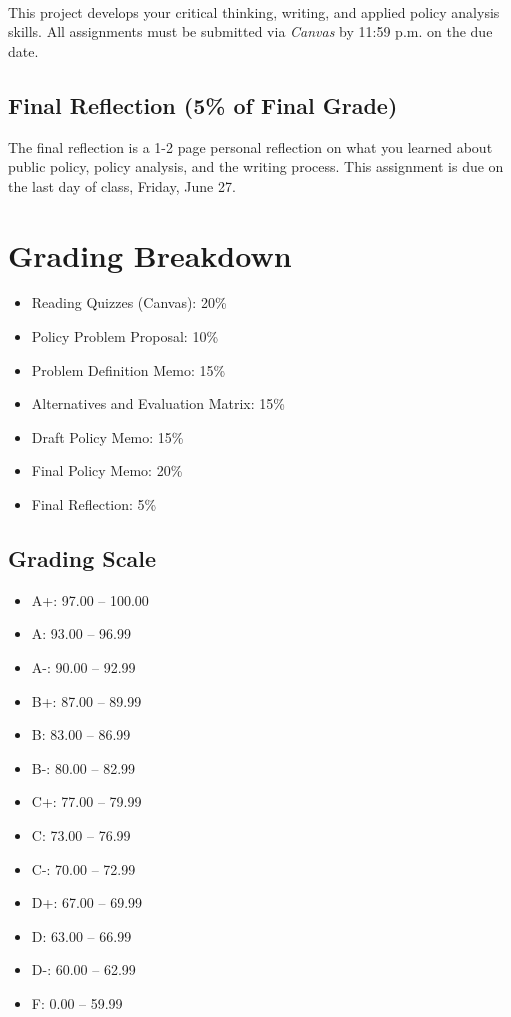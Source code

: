 \documentclass[11pt, letterpaper]{article}
\begin{document}
\paragraph{} This project develops your critical thinking, writing, and applied policy analysis skills. All assignments must be submitted via \emph{Canvas} by 11:59 p.m. on the due date.

\subsection*{Final Reflection (5\% of Final Grade)}

The final reflection is a 1-2 page personal reflection on what you learned about public policy, policy analysis, and the writing process. This assignment is due on the last day of class, Friday, June 27.


\section{Grading Breakdown}
\begin{itemize}
  \item Reading Quizzes (Canvas): 20\%
  \item Policy Problem Proposal: 10\%
  \item Problem Definition Memo: 15\%
  \item Alternatives and Evaluation Matrix: 15\%
  \item Draft Policy Memo: 15\%
  \item Final Policy Memo: 20\%
  \item Final Reflection: 5\%
\end{itemize}

\subsection*{Grading Scale}

\begin{itemize}
    \item A+: 97.00 -- 100.00
    \item A: 93.00 -- 96.99
    \item A-: 90.00 -- 92.99
    \item B+: 87.00 -- 89.99
    \item B: 83.00 -- 86.99
    \item B-: 80.00 -- 82.99
    \item C+: 77.00 -- 79.99
    \item C: 73.00 -- 76.99
    \item C-: 70.00 -- 72.99
    \item D+: 67.00 -- 69.99
    \item D: 63.00 -- 66.99
    \item D-: 60.00 -- 62.99
    \item F: 0.00 -- 59.99
\end{itemize}
\end{document}
